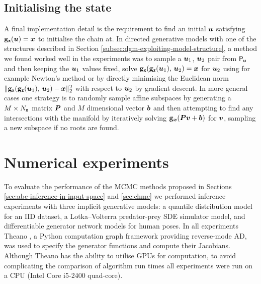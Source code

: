 \subsection{Initialising the state}

A final implementation detail is the requirement to find an initial $\boldsymbol{u}$ satisfying ${\mathbf{g}}_{\boldsymbol{\mathsf{x}}}(\boldsymbol{u}) = \boldsymbol{x}$ to initialise the chain at. In directed generative models with one of the structures described in Section \ref{subsec:dgm-exploiting-model-structure}, a method we found worked well in the experiments was to sample a $\boldsymbol{u}_1$, $\boldsymbol{u}_2$ pair from $\mathsf{P}_{\boldsymbol{\mathsf{u}}}$ and then keeping the $\boldsymbol{u}_1$ values fixed, solve $\genfunc_{\rvct{x}}\lpa\genfunc_{\rvct{z}}(\vct{u}_1),\,\vct{u}_2\rpa= \vct{x}$ for $\boldsymbol{u}_2$ using for example Newton's method or by directly minimising the Euclidean norm $\Vert\genfunc_{\rvct{x}}\lpa\genfunc_{\rvct{z}}(\vct{u}_1),\,\vct{u}_2\rpa - \vct{x}\Vert_2^2$ with respect to $\boldsymbol{u}_2$ by gradient descent. In more general cases one strategy is to randomly sample affine subspaces by generating a $M \times N_{\boldsymbol{\mathsf{x}}}$ matrix $\boldsymbol{P}$ and $M$ dimensional vector $\boldsymbol{b}$ and then attempting to find any intersections with the manifold by iteratively solving $\genfunc_{\vct{x}}\lpa\mtx{P}\vct{v} + \vct{b}\rpa$ for $\boldsymbol{v}$, sampling a new subspace if no roots are found.


\section{Numerical experiments}\label{sec:dgm-experiments}

To evaluate the performance of the \ac{MCMC} methods proposed in Sections \ref{sec:abc-inference-in-input-space} and \ref{sec:chmc} we performed inference experiments with three implicit generative models: a quantile distribution model for an \acs{IID} dataset, a Lotka--Volterra predator-prey \acs{SDE} simulator model, and differentiable generator network models for human poses. In all experiments Theano \citep{theano2016theano}, a Python computation graph framework providing reverse-mode \ac{AD}, was used to specify the generator functions and compute their Jacobians. Although Theano has the ability to utilise \acp{GPU} for computation, to avoid complicating the comparison of algorithm run times all experiments were run on a \ac{CPU} (Intel Core i5-2400 quad-core). %

